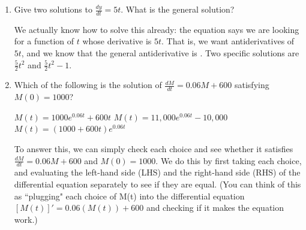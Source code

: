 \documentclass[main]{subfiles}
\begin{document}
\begin{enumerate}
\item  \label{diffeq-sol-guess-1}
  \begin{problem}[2in]
    Give two solutions to $\frac{dy}{dt} = 5t$.  What is the general
    solution?
  \end{problem}

  \begin{solution}
    We actually know how to solve this already: the equation says we are
    looking for a function of $t$ whose derivative is $5t$.  That is, we
    want antiderivatives of $5t$, and we know that the general
    antiderivative is .  Two specific
    solutions are $\frac{5}{2} t^2$ and $\frac{5}{2} t^2 - 1$.
  \end{solution}


  
\pspace{\newpage}



\item  \label{moneybags-continuous-compounding-deposit-solution} 

  
  \begin{problem}[1in]
    Which of the following is the solution of $\displaystyle \frac{dM}{dt}
    = 0.06M + 600$ satisfying $M(0) = 1000$?
    \begin{enumerate}[label=\protect\maybecircle{\roman*.},ref=\roman*]
    \plainitem $M(t) = 1000 e^{0.06 t} + 600t$
    \circleitem \label{moneybags-continuous-compounding-deposit-solution-right-choice}
      $M(t) = 11,000 e^{0.06 t} - 10,000$ 
    \plainitem $M(t) = (1000 + 600 t) e^{0.06 t}$
    \end{enumerate}
  \end{problem}

  \begin{solution}
    To answer this, we can simply check each choice and see whether it
    satisfies $\frac{dM}{dt} = 0.06 M + 600$ and $M(0) = 1000$. We do this by first taking each choice, and evaluating the left-hand side (LHS) and the right-hand side (RHS) of the differential equation separately to see if they are equal. (You can think of this as ``plugging" each choice of M(t) into the differential equation $[M(t)]'=0.06(M(t))+600$ and checking if it makes the equation work.)


\end{solution}
\end{enumerate}
\end{document}
